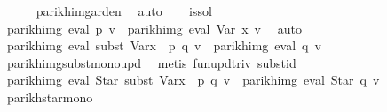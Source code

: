 \begin{isabellebody}
\ \ \ \ \isamarkupfalse%
\ parikh{\isacharunderscore}{\kern0pt}img{\isacharunderscore}{\kern0pt}arden\ \isamarkupfalse%
\ auto\isanewline
\isanewline
\ \ \isamarkupfalse%
\ is{\isacharunderscore}{\kern0pt}sol{\isacharprime}{\kern0pt}\ \isamarkupfalse%
\ {\isachardoublequoteopen}parikh{\isacharunderscore}{\kern0pt}img\ {\isacharparenleft}{\kern0pt}eval\ p\ v{\isacharparenright}{\kern0pt}\ {\isasymsubseteq}\ parikh{\isacharunderscore}{\kern0pt}img\ {\isacharparenleft}{\kern0pt}eval\ {\isacharparenleft}{\kern0pt}Var\ x{\isacharparenright}{\kern0pt}\ v{\isacharparenright}{\kern0pt}{\isachardoublequoteclose}\ \isamarkupfalse%
\ auto\isanewline
\ \ \isamarkupfalse%
\ \isamarkupfalse%
\ {\isachardoublequoteopen}parikh{\isacharunderscore}{\kern0pt}img\ {\isacharparenleft}{\kern0pt}eval\ {\isacharparenleft}{\kern0pt}subst\ {\isacharparenleft}{\kern0pt}Var{\isacharparenleft}{\kern0pt}x\ {\isacharcolon}{\kern0pt}{\isacharequal}{\kern0pt}\ p{\isacharparenright}{\kern0pt}{\isacharparenright}{\kern0pt}\ q{\isacharparenright}{\kern0pt}\ v{\isacharparenright}{\kern0pt}\ {\isasymsubseteq}\ parikh{\isacharunderscore}{\kern0pt}img\ {\isacharparenleft}{\kern0pt}eval\ q\ v{\isacharparenright}{\kern0pt}{\isachardoublequoteclose}\isanewline
\ \ \ \ \isamarkupfalse%
\ parikh{\isacharunderscore}{\kern0pt}img{\isacharunderscore}{\kern0pt}subst{\isacharunderscore}{\kern0pt}mono{\isacharunderscore}{\kern0pt}upd\ \isamarkupfalse%
\ {\isacharparenleft}{\kern0pt}metis\ fun{\isacharunderscore}{\kern0pt}upd{\isacharunderscore}{\kern0pt}triv\ subst{\isacharunderscore}{\kern0pt}id{\isacharparenright}{\kern0pt}\isanewline
\ \ \isamarkupfalse%
\ \isamarkupfalse%
\ {\isachardoublequoteopen}parikh{\isacharunderscore}{\kern0pt}img\ {\isacharparenleft}{\kern0pt}eval\ {\isacharparenleft}{\kern0pt}Star\ {\isacharparenleft}{\kern0pt}subst\ {\isacharparenleft}{\kern0pt}Var{\isacharparenleft}{\kern0pt}x\ {\isacharcolon}{\kern0pt}{\isacharequal}{\kern0pt}\ p{\isacharparenright}{\kern0pt}{\isacharparenright}{\kern0pt}\ q{\isacharparenright}{\kern0pt}{\isacharparenright}{\kern0pt}\ v{\isacharparenright}{\kern0pt}\ {\isasymsubseteq}\ parikh{\isacharunderscore}{\kern0pt}img\ {\isacharparenleft}{\kern0pt}eval\ {\isacharparenleft}{\kern0pt}Star\ q{\isacharparenright}{\kern0pt}\ v{\isacharparenright}{\kern0pt}{\isachardoublequoteclose}\isanewline
\ \ \ \ \isamarkupfalse%
\ parikh{\isacharunderscore}{\kern0pt}star{\isacharunderscore}{\kern0pt}mono\ \isamarkupfalse%

\end{isabellebody}
